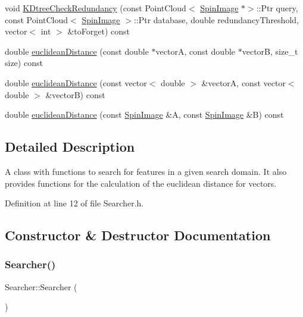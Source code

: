 \begin{DoxyCompactItemize}
\item 
void \hyperlink{class_searcher_aa5c9be08f9e94a93bc767e56a17eed9d}{K\+Dtree\+Check\+Redundancy} (const Point\+Cloud$<$ \hyperlink{include_8h_ab79ade12a22a8e5e2864650f820e9c6f}{Spin\+Image} $\ast$$>$\+::Ptr query, const Point\+Cloud$<$ \hyperlink{include_8h_ab79ade12a22a8e5e2864650f820e9c6f}{Spin\+Image} $>$\+::Ptr database, double redundancy\+Threshold, vector$<$ int $>$ \&to\+Forget) const
\item 
double \hyperlink{class_searcher_af014c108e385e12afd5561f9547343c9}{euclidean\+Distance} (const double $\ast$vectorA, const double $\ast$vectorB, size\+\_\+t size) const
\item 
double \hyperlink{class_searcher_a774e173960b031678013a26c14d29dea}{euclidean\+Distance} (const vector$<$ double $>$ \&vectorA, const vector$<$ double $>$ \&vectorB) const
\item 
double \hyperlink{class_searcher_a4ed497f0d5f1f21c161d9101c0c980aa}{euclidean\+Distance} (const \hyperlink{include_8h_ab79ade12a22a8e5e2864650f820e9c6f}{Spin\+Image} \&A, const \hyperlink{include_8h_ab79ade12a22a8e5e2864650f820e9c6f}{Spin\+Image} \&B) const
\end{DoxyCompactItemize}


\subsection{Detailed Description}
A class with functions to search for features in a given search domain. It also provides functions for the calculation of the euclidean distance for vectors. 

Definition at line 12 of file Searcher.\+h.



\subsection{Constructor \& Destructor Documentation}
\mbox{\label{class_searcher_a46e9a9fa3aad21131cf6bd25237e3a80}} 
\subsubsection{\texorpdfstring{Searcher()}{Searcher()}}
{\footnotesize\ttfamily Searcher\+::\+Searcher (\begin{DoxyParamCaption}{ }\end{DoxyParamCaption})}



